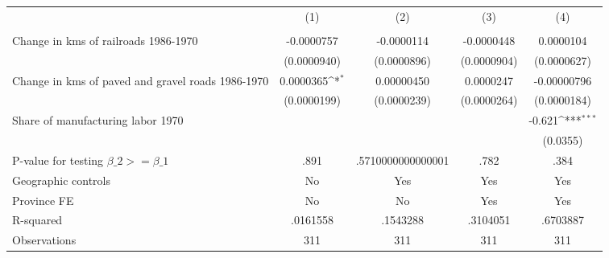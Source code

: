 {
\def\sym#1{\ifmmode^{#1}\else\(^{#1}\)\fi}
\begin{tabular}{l*{4}{c}}
\hline\hline
                &\multicolumn{1}{c}{(1)}&\multicolumn{1}{c}{(2)}&\multicolumn{1}{c}{(3)}&\multicolumn{1}{c}{(4)}\\
                &\multicolumn{1}{c}{}&\multicolumn{1}{c}{}&\multicolumn{1}{c}{}&\multicolumn{1}{c}{}\\
\hline
Change in kms of railroads 1986-1970&-0.0000757         &-0.0000114         &-0.0000448         &0.0000104         \\
                &(0.0000940)         &(0.0000896)         &(0.0000904)         &(0.0000627)         \\
[1em]
Change in kms of paved and gravel roads 1986-1970&0.0000365\sym{*}  &0.00000450         &0.0000247         &-0.00000796         \\
                &(0.0000199)         &(0.0000239)         &(0.0000264)         &(0.0000184)         \\
[1em]
Share of manufacturing labor 1970&                  &                  &                  &   -0.621\sym{***}\\
                &                  &                  &                  & (0.0355)         \\
\hline
P-value for testing $\beta\_{2} >= \beta\_{1}$&     .891         &.5710000000000001         &     .782         &     .384         \\
Geographic controls&       No         &      Yes         &      Yes         &      Yes         \\
Province FE     &       No         &       No         &      Yes         &      Yes         \\
R-squared       & .0161558         & .1543288         & .3104051         & .6703887         \\
Observations    &      311         &      311         &      311         &      311         \\
\hline\hline
\end{tabular}
}
